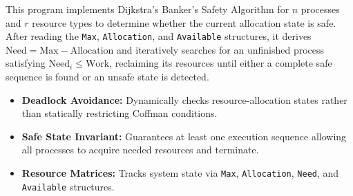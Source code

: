 \documentclass[11pt,a4paper]{article}
\begin{document}
This program implements Dijkstra's Banker's Safety Algorithm for $n$ processes and $r$ resource types to determine whether the current allocation state is safe. After reading the \texttt{Max}, \texttt{Allocation}, and \texttt{Available} structures, it derives $\text{Need} = \text{Max} - \text{Allocation}$ and iteratively searches for an unfinished process satisfying $\text{Need}_i \le \text{Work}$, reclaiming its resources until either a complete safe sequence is found or an unsafe state is detected.

\begin{itemize}
    \item \textbf{Deadlock Avoidance:} Dynamically checks resource-allocation states rather than statically restricting Coffman conditions.
    \item \textbf{Safe State Invariant:} Guarantees at least one execution sequence allowing all processes to acquire needed resources and terminate.
    \item \textbf{Resource Matrices:} Tracks system state via \texttt{Max}, \texttt{Allocation}, \texttt{Need}, and \texttt{Available} structures.
\end{itemize}
\end{document}
